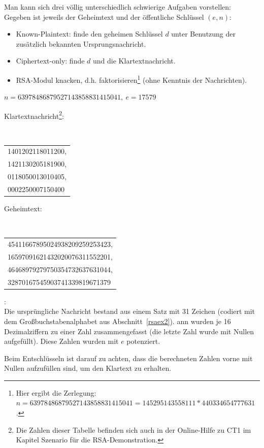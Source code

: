 \begin{refsegment}
Man kann sich drei völlig unterschiedlich schwierige Aufgaben vorstellen:
Gegeben ist jeweils der Geheimtext und der öffentliche Schlüssel $(e,n)$:
\begin{itemize}
\item {} Known-Plaintext: finde den geheimen Schlüssel $d$ unter Benutzung der
zusätzlich bekannten Ursprungsnachricht.
\item {} Ciphertext-only: finde $d$ und die Klartextnachricht.
\item {} RSA-Modul knacken, d.h. faktorisieren\footnote{%
  Hier ergibt die Zerlegung: $n = 63978486879527143858831415041 = 145295143558111 * 440334654777631$.
} (ohne Kenntnis der Nachrichten).
\end{itemize}

$n = 63978486879527143858831415041, ~e = 17579$

Klartextnachricht\footnote{%
  Die Zahlen dieser Tabelle befinden sich auch in der Online-Hilfe zu
  CT1 im Kapitel \glqq Szenario für die RSA-Demonstration\grqq.
}:

{\tt
\begin{tabular}{l}
1401202118011200,\\
1421130205181900,\\
0118050013010405,\\
0002250007150400
\end{tabular} } %

Geheimtext:

{\tt
\begin{tabular}{l}
45411667895024938209259253423,\\
16597091621432020076311552201,\\
46468979279750354732637631044,\\
32870167545903741339819671379
\end{tabular} } %

\begin{remark}{:}\\
Die ursprüngliche Nachricht bestand aus einem Satz mit 31 Zeichen (codiert
mit dem Großbuchstabenalphabet aus Abschnitt~\ref{rsaex2}).
ann wurden je 16 Dezimalziffern zu
einer Zahl zusammengefasst (die letzte Zahl wurde mit Nullen aufgefüllt).
Diese Zahlen wurden mit $e$ potenziert.
\end{remark}

Beim Entschlüsseln ist darauf zu achten, dass die berechneten Zahlen vorne
mit Nullen aufzufüllen sind, um den Klartext zu erhalten.


\end{refsegment}
